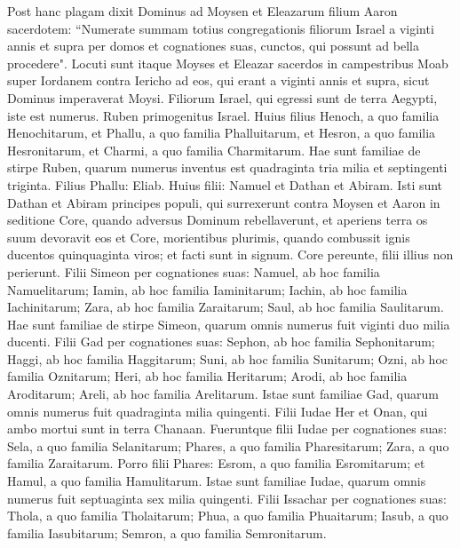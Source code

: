 \begin{biblechapter}  
\verse Post hanc plagam dixit Dominus ad Moysen et Eleazarum filium Aaron sacerdotem: 
\verse “Numerate summam totius congregationis filiorum Israel a viginti annis et supra per domos et cognationes suas, cunctos, qui possunt ad bella procedere". 
\verse Locuti sunt itaque Moyses et Eleazar sacerdos in campestribus Moab super Iordanem contra Iericho ad eos, qui erant 
\verse a viginti annis et supra, sicut Dominus imperaverat Moysi. Filiorum Israel, qui egressi sunt de terra Aegypti, iste est numerus. 
\verse Ruben primogenitus Israel. Huius filius Henoch, a quo familia Henochitarum, et Phallu, a quo familia Phalluitarum, 
\verse et Hesron, a quo familia Hesronitarum, et Charmi, a quo familia Charmitarum. 
\verse Hae sunt familiae de stirpe Ruben, quarum numerus inventus est quadraginta tria milia et septingenti triginta.  
\verse Filius Phallu: Eliab. 
\verse Huius filii: Namuel et Dathan et Abiram. Isti sunt Dathan et Abiram principes populi, qui surrexerunt contra Moysen et Aaron in seditione Core, quando adversus Dominum rebellaverunt, 
\verse et aperiens terra os suum devoravit eos et Core, morientibus plurimis, quando combussit ignis ducentos quinquaginta viros; et facti sunt in signum. 
\verse Core pereunte, filii illius non perierunt. 
\verse Filii Simeon per cognationes suas: Namuel, ab hoc familia Namuelitarum; Iamin, ab hoc familia Iaminitarum; Iachin, ab hoc familia Iachinitarum; 
\verse Zara, ab hoc familia Zaraitarum; Saul, ab hoc familia Saulitarum. 
\verse Hae sunt familiae de stirpe Simeon, quarum omnis numerus fuit viginti duo milia ducenti. 
\verse Filii Gad per cognationes suas: Sephon, ab hoc familia Sephonitarum; Haggi, ab hoc familia Haggitarum; Suni, ab hoc familia Sunitarum; 
\verse Ozni, ab hoc familia Oznitarum; Heri, ab hoc familia Heritarum; 
\verse Arodi, ab hoc familia Aroditarum; Areli, ab hoc familia Arelitarum. 
\verse Istae sunt familiae Gad, quarum omnis numerus fuit quadraginta milia quingenti. 
\verse Filii Iudae Her et Onan, qui ambo mortui sunt in terra Chanaan. 
\verse Fueruntque filii Iudae per cognationes suas: Sela, a quo familia Selanitarum; Phares, a quo familia Pharesitarum; Zara, a quo familia Zaraitarum. 
\verse Porro filii Phares: Esrom, a quo familia Esromitarum; et Hamul, a quo familia Hamulitarum. 
\verse Istae sunt familiae Iudae, quarum omnis numerus fuit septuaginta sex milia quingenti. 
\verse Filii Issachar per cognationes suas: Thola, a quo familia Tholaitarum; Phua, a quo familia Phuaitarum; 
\verse Iasub, a quo familia Iasubitarum; Semron, a quo familia Semronitarum. 

\end{biblechapter}

